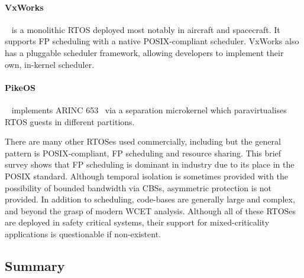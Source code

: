 \paragraph{VxWorks}~\citep{VxWorks_08} is a monolithic \gls{RTOS} deployed most notably in aircraft
and spacecraft.  It supports \gls{FP} scheduling with a native POSIX-compliant scheduler.  VxWorks
also has a pluggable scheduler framework, allowing developers to implement their own, in-kernel
scheduler.

\paragraph{PikeOS}~\citep{PikeOS:URL} implements ARINC 653~\citep{ARINC653} via a separation
microkernel which paravirtualises RTOS guests in different partitions.

There are many other \gls{RTOS}es used commercially, including \citet{Deos:URL} but the general pattern is POSIX-compliant, \gls{FP} scheduling and resource sharing.
This brief survey shows that \gls{FP} scheduling is dominant in industry due to its place in the POSIX standard. 
Although temporal isolation is sometimes provided with the possibility of bounded bandwidth via
\glspl{CBS}, asymmetric protection is not provided.  In addition to scheduling, code-bases are
generally large and complex, and beyond the grasp of modern {\gls{WCET}} analysis.  Although all of
these \gls{RTOS}es are deployed in safety critical systems, their support for mixed-criticality
applications is questionable if non-existent. 



\subsection{Summary}


